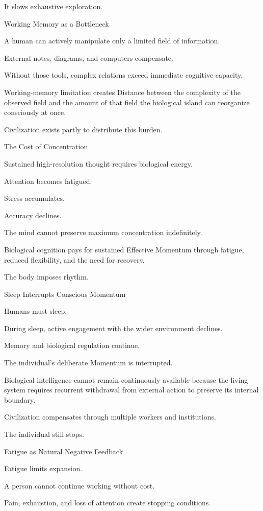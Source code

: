 It slows exhaustive exploration.

Working Memory as a Bottleneck

A human can actively manipulate only a limited field of information.

External notes, diagrams, and computers compensate.

Without those tools, complex relations exceed immediate cognitive capacity.

Working-memory limitation creates Distance between the complexity of the observed field and the amount of that field the biological island can reorganize consciously at once.

Civilization exists partly to distribute this burden.

The Cost of Concentration

Sustained high-resolution thought requires biological energy.

Attention becomes fatigued.

Stress accumulates.

Accuracy declines.

The mind cannot preserve maximum concentration indefinitely.

Biological cognition pays for sustained Effective Momentum through fatigue, reduced flexibility, and the need for recovery.

The body imposes rhythm.

Sleep Interrupts Conscious Momentum

Humans must sleep.

During sleep, active engagement with the wider environment declines.

Memory and biological regulation continue.

The individual’s deliberate Momentum is interrupted.

Biological intelligence cannot remain continuously available because the living system requires recurrent withdrawal from external action to preserve its internal boundary.

Civilization compensates through multiple workers and institutions.

The individual still stops.

Fatigue as Natural Negative Feedback

Fatigue limits expansion.

A person cannot continue working without cost.

Pain, exhaustion, and loss of attention create stopping conditions.

